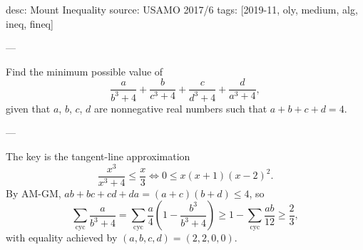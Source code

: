 desc: Mount Inequality
source: USAMO 2017/6
tags: [2019-11, oly, medium, alg, ineq, fineq]

---

Find the minimum possible value of \[\frac a{b^3+4}+\frac b{c^3+4}+\frac c{d^3+4}+\frac d{a^3+4},\]
given that $a$, $b$, $c$, $d$ are nonnegative real numbers such that $a+b+c+d=4$.

---

The key is the tangent-line approximation \[\frac{x^3}{x^3+4}\le\frac x3\iff 0\le x(x+1)(x-2)^2.\]
By AM-GM, $ab+bc+cd+da=(a+c)(b+d)\le4$, so \[\sum_\mathrm{cyc}\frac a{b^3+4}=\sum_\mathrm{cyc}\frac a4\left(1-\frac{b^3}{b^3+4}\right)\ge1-\sum_\mathrm{cyc}\frac{ab}{12}\ge\frac23,\]
with equality achieved by $(a,b,c,d)=(2,2,0,0)$.


